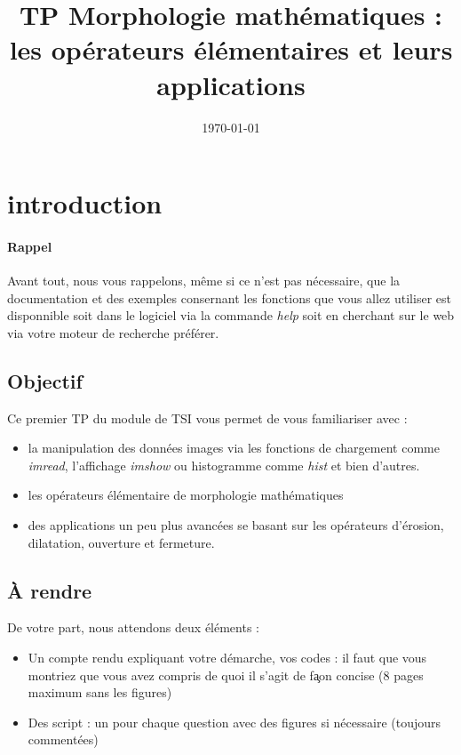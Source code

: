\documentclass[10pt,a4paper]{article}
\title{TP Morphologie math\'{e}matiques : les op\'{e}rateurs \'{e}l\'{e}mentaires et leurs applications}
\author{} %
\date{\today}
\begin{document}
\maketitle

\section{introduction} 
\paragraph{Rappel}
Avant tout, nous vous rappelons, m\^{e}me si ce n'est pas n\'{e}cessaire, que la documentation et des exemples consernant les fonctions que vous allez utiliser est disponnible soit dans le logiciel via la commande \textit{help} soit en cherchant sur le web via votre moteur de recherche pr\'{e}f\'{e}rer. 

\subsection{Objectif}
Ce premier TP du module de TSI vous permet de vous familiariser avec :
\begin{itemize}
	\item la manipulation des donn\'{e}es images via les fonctions de chargement comme \textit{imread}, l'affichage \textit{imshow} ou histogramme comme \textit{hist} et bien d'autres.
	\item les op\'{e}rateurs \'{e}l\'{e}mentaire de morphologie math\'{e}matiques
	\item des applications un peu plus avanc\'{e}es se basant sur les op\'{e}rateurs d’\'{e}rosion, dilatation, ouverture et fermeture.
\end{itemize}

\subsection{\`{A} rendre}
De votre part, nous attendons deux \'{e}l\'{e}ments : 
\begin{itemize}
	\item Un compte rendu expliquant votre d\'{e}marche, vos codes : il faut que vous montriez que vous avez compris de quoi il s'agit de fa\c{}on concise (8 pages maximum sans les figures)
	\item Des script : un pour chaque question avec des figures si n\'{e}cessaire (toujours comment\'{e}es)
\end{itemize}
\end{document}
